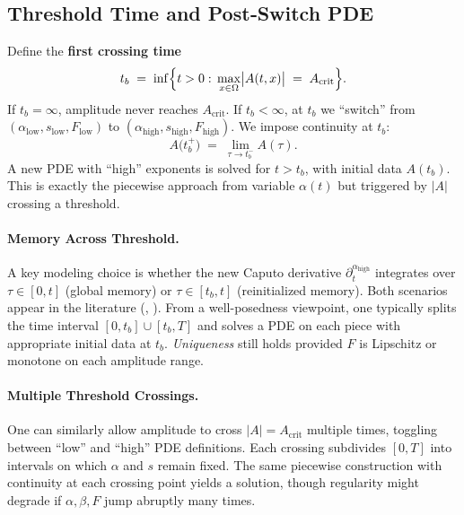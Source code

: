 \documentclass[12pt]{article}
\begin{document}
\subsection{Threshold Time and Post‐Switch PDE}
\label{subsec:threshold_time}

Define the \textbf{first crossing time}
\[
t_b
\;=\;
\inf\Bigl\{
  t>0:\,
  \max_{x\in\Omega}\bigl\lvert A(t,x)\bigr\rvert
  \;=\;
  A_{\mathrm{crit}}
\Bigr\}.
\]
If \(t_b = \infty\), amplitude never reaches \(A_{\mathrm{crit}}\).  If \(t_b<\infty\),
at \(t_b\) we “switch” from
\((\alpha_{\mathrm{low}}, s_{\mathrm{low}}, F_{\mathrm{low}})\)
to
\((\alpha_{\mathrm{high}}, s_{\mathrm{high}}, F_{\mathrm{high}})\).
We impose continuity at \(t_b\):
\[
A\bigl(t_b^+\bigr)
\;=\;
\lim_{\tau\to t_b^-} A(\tau).
\]
A new PDE with “high” exponents is solved for \(t>t_b\), with initial data \(A(t_b)\).
This is exactly the piecewise approach from variable \(\alpha(t)\) but triggered by
\(\lvert A\rvert\) crossing a threshold.

\paragraph{Memory Across Threshold.}
A key modeling choice is whether the new Caputo derivative
\(\partial_t^{\alpha_{\mathrm{high}}}\) integrates over \(\tau\in[0,t]\) (global memory)
or \(\tau\in[t_b,t]\) (reinitialized memory).  Both scenarios appear in the literature
(\cite[Ch.\,6]{Magin2006}, \cite{Sun2019}).  From a well-posedness viewpoint, one typically
splits the time interval \([0,t_b]\cup[t_b,T]\) and solves a PDE on each piece with
appropriate initial data at \(t_b\).  \emph{Uniqueness} still holds provided \(F\) is
Lipschitz or monotone on each amplitude range.

\paragraph{Multiple Threshold Crossings.}
One can similarly allow amplitude to cross \(\lvert A\rvert=A_{\mathrm{crit}}\) multiple
times, toggling between “low” and “high” PDE definitions.  Each crossing subdivides
\([0,T]\) into intervals on which \(\alpha\) and \(s\) remain fixed.  The same piecewise
construction with continuity at each crossing point yields a solution, though regularity
might degrade if \(\alpha,\beta,F\) jump abruptly many times.

\end{document}
